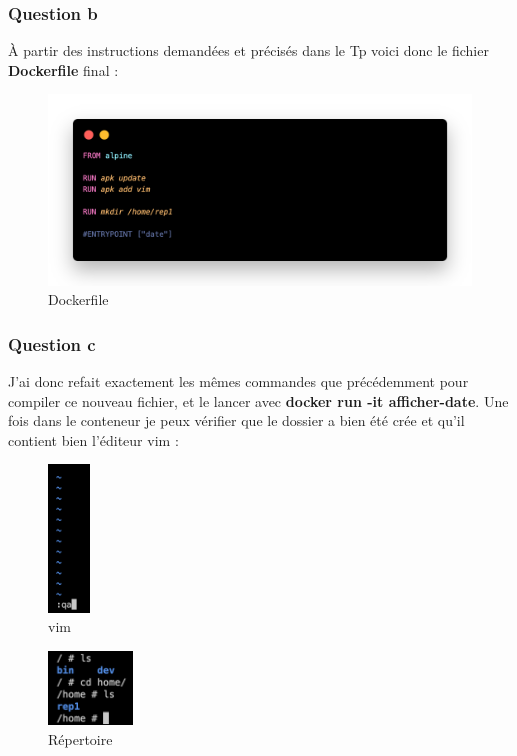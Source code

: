 \documentclass[12pt, a4paper]{article}
\begin{document}
\subsubsection{Question b}
À partir des instructions demandées et précisés dans le Tp voici donc le 
fichier \textbf{Dockerfile} final :

\begin{figure}[h]
    \centering
    \includegraphics[width=1\textwidth]{img/code1.png}
    \caption{Dockerfile}
    \label{fig:dockerfile}
\end{figure}

\newpage
\subsubsection{Question c}
J'ai donc refait exactement les mêmes commandes que précédemment pour compiler
ce nouveau fichier, et le lancer avec \textbf{docker run -it afficher-date}.
Une fois dans le conteneur je peux vérifier que le dossier a bien été crée et 
qu'il contient bien l'éditeur vim :
\begin{figure}[h]
    \centering
    \includegraphics[width=0.1\textwidth]{img/vim.png}
    \caption{vim}
    \label{fig:vim}
\end{figure}
\begin{figure}[h]
    \centering
    \includegraphics[width=0.2\textwidth]{img/rep.png}
    \caption{Répertoire}
    \label{fig:rep}
\end{figure}
\end{document}
